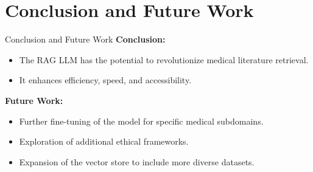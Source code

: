 \documentclass{beamer}
\begin{document}
\section{Conclusion and Future Work}
\begin{frame}{Conclusion and Future Work}
  \textbf{Conclusion:}
  \begin{itemize}
    \item The RAG LLM has the potential to revolutionize medical literature retrieval.
    \item It enhances efficiency, speed, and accessibility.
  \end{itemize}
  \textbf{Future Work:}
  \begin{itemize}
    \item Further fine-tuning of the model for specific medical subdomains.
    \item Exploration of additional ethical frameworks.
    \item Expansion of the vector store to include more diverse datasets.
  \end{itemize}
\end{frame}
\end{document}
